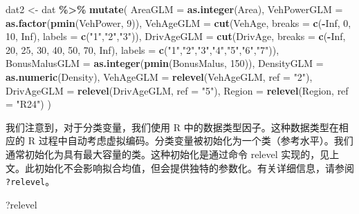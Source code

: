 \documentclass[
]{article}
\newenvironment{Shaded}{\begin{snugshade}}{\end{snugshade}}
\newcommand{\AttributeTok}[1]{\textcolor[rgb]{0.13,0.29,0.53}{#1}}
\newcommand{\ConstantTok}[1]{\textcolor[rgb]{0.56,0.35,0.01}{#1}}
\newcommand{\DecValTok}[1]{\textcolor[rgb]{0.00,0.00,0.81}{#1}}
\newcommand{\FunctionTok}[1]{\textcolor[rgb]{0.13,0.29,0.53}{\textbf{#1}}}
\newcommand{\NormalTok}[1]{#1}
\newcommand{\OtherTok}[1]{\textcolor[rgb]{0.56,0.35,0.01}{#1}}
\newcommand{\SpecialCharTok}[1]{\textcolor[rgb]{0.81,0.36,0.00}{\textbf{#1}}}
\newcommand{\StringTok}[1]{\textcolor[rgb]{0.31,0.60,0.02}{#1}}
\begin{document}
\begin{Shaded}
\begin{Highlighting}[]
\NormalTok{dat2 }\OtherTok{\textless{}{-}}\NormalTok{ dat }\SpecialCharTok{\%\textgreater{}\%} \FunctionTok{mutate}\NormalTok{(}
  \AttributeTok{AreaGLM =} \FunctionTok{as.integer}\NormalTok{(Area),}
  \AttributeTok{VehPowerGLM =} \FunctionTok{as.factor}\NormalTok{(}\FunctionTok{pmin}\NormalTok{(VehPower, }\DecValTok{9}\NormalTok{)),}
  \AttributeTok{VehAgeGLM =} \FunctionTok{cut}\NormalTok{(VehAge, }\AttributeTok{breaks =} \FunctionTok{c}\NormalTok{(}\SpecialCharTok{{-}}\ConstantTok{Inf}\NormalTok{, }\DecValTok{0}\NormalTok{, }\DecValTok{10}\NormalTok{, }\ConstantTok{Inf}\NormalTok{), }\AttributeTok{labels =} \FunctionTok{c}\NormalTok{(}\StringTok{"1"}\NormalTok{,}\StringTok{"2"}\NormalTok{,}\StringTok{"3"}\NormalTok{)),}
  \AttributeTok{DrivAgeGLM =} \FunctionTok{cut}\NormalTok{(DrivAge, }\AttributeTok{breaks =} \FunctionTok{c}\NormalTok{(}\SpecialCharTok{{-}}\ConstantTok{Inf}\NormalTok{, }\DecValTok{20}\NormalTok{, }\DecValTok{25}\NormalTok{, }\DecValTok{30}\NormalTok{, }\DecValTok{40}\NormalTok{, }\DecValTok{50}\NormalTok{, }\DecValTok{70}\NormalTok{, }\ConstantTok{Inf}\NormalTok{), }\AttributeTok{labels =} \FunctionTok{c}\NormalTok{(}\StringTok{"1"}\NormalTok{,}\StringTok{"2"}\NormalTok{,}\StringTok{"3"}\NormalTok{,}\StringTok{"4"}\NormalTok{,}\StringTok{"5"}\NormalTok{,}\StringTok{"6"}\NormalTok{,}\StringTok{"7"}\NormalTok{)),}
  \AttributeTok{BonusMalusGLM =} \FunctionTok{as.integer}\NormalTok{(}\FunctionTok{pmin}\NormalTok{(BonusMalus, }\DecValTok{150}\NormalTok{)),}
  \AttributeTok{DensityGLM =} \FunctionTok{as.numeric}\NormalTok{(Density),}
  \AttributeTok{VehAgeGLM =} \FunctionTok{relevel}\NormalTok{(VehAgeGLM, }\AttributeTok{ref =} \StringTok{"2"}\NormalTok{),   }
  \AttributeTok{DrivAgeGLM =} \FunctionTok{relevel}\NormalTok{(DrivAgeGLM, }\AttributeTok{ref =} \StringTok{"5"}\NormalTok{),}
  \AttributeTok{Region =} \FunctionTok{relevel}\NormalTok{(Region, }\AttributeTok{ref =} \StringTok{"R24"}\NormalTok{)}
\NormalTok{)}
\end{Highlighting}
\end{Shaded}

我们注意到，对于分类变量，我们使用 R
中的数据类型因子。这种数据类型在相应的 R
过程中自动考虑虚拟编码。分类变量被初始化为一个类（参考水平）。我们通常初始化为具有最大容量的类。这种初始化是通过命令
relevel
实现的，见上文。此初始化不会影响拟合均值，但会提供独特的参数化。有关详细信息，请参阅
\texttt{?relevel}。

\begin{Shaded}
\begin{Highlighting}[]
\NormalTok{?relevel}
\end{Highlighting}
\end{Shaded}
\end{document}
